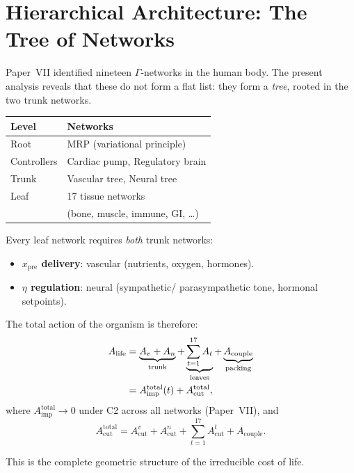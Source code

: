 \documentclass[aps,pre,twocolumn,superscriptaddress,longbibliography]{revtex4-2}
\newcommand{\Acut}{A_{\text{cut}}}
\newcommand{\Aimp}{A_{\text{imp}}}
\newcommand{\Acouple}{A_{\text{couple}}}
\begin{document}
\section{Hierarchical Architecture: The Tree of Networks}
\label{sec:tree}

Paper~VII identified nineteen $\Gamma$-networks in the
human body.
The present analysis reveals that these do not form a
flat list: they form a \emph{tree}, rooted in the two
trunk networks.

\begin{center}
\begin{tabular}{ll}
\hline
\textbf{Level} & \textbf{Networks} \\
\hline
Root & MRP (variational principle) \\
Controllers & Cardiac pump, Regulatory brain \\
Trunk & Vascular tree, Neural tree \\
Leaf & 17 tissue networks \\
  & (bone, muscle, immune, GI, \ldots) \\
\hline
\end{tabular}
\end{center}

Every leaf network requires \emph{both} trunk networks:
\begin{itemize}
  \item \textbf{$x_{\text{pre}}$ delivery}: vascular
    (nutrients, oxygen, hormones).
  \item \textbf{$\eta$ regulation}: neural (sympathetic/
    parasympathetic tone, hormonal setpoints).
\end{itemize}

The total action of the organism is therefore:
\begin{align}
  A_{\text{life}} &= \underbrace{A_v + A_n}_{\text{trunk}}
    + \underbrace{\sum_{t=1}^{17} A_t}_{\text{leaves}}
    + \underbrace{\Acouple}_{\text{packing}} \notag \\
  &= \Aimp^{\text{total}}(t) + \Acut^{\text{total}},
  \label{eq:A-life}
\end{align}
where $\Aimp^{\text{total}} \to 0$ under C2 across all
networks (Paper~VII), and
\begin{equation}
  \Acut^{\text{total}} = \Acut^v + \Acut^n
    + \sum_{t=1}^{17} \Acut^t + \Acouple.
  \label{eq:acut-total}
\end{equation}

This is the complete geometric structure of the
irreducible cost of life.
\end{document}
